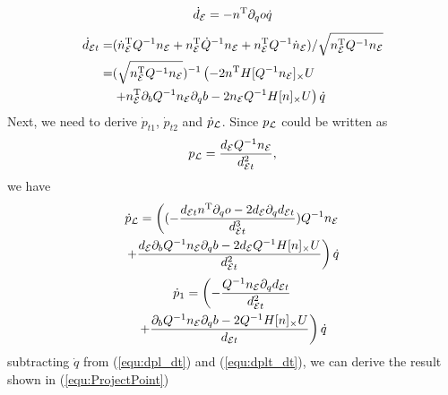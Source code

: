 \documentclass[journal]{IEEEtran}  %
\begin{document}
    \begin{equation}
      \dot d_{\mathcal{E}} = -n^\mathrm{T} \partial_q o \dot q
    \end{equation}
    \begin{equation}\label{equ:dot det}
      \begin{split}
        \dot d_{\mathcal{E} t} =&  (\dot n_{\mathcal{E}}^\mathrm{T} Q^{-1} n_{\mathcal{E}} + n_{\mathcal{E}}^\mathrm{T} \dot Q^{-1} n_{\mathcal{E}} + n_{\mathcal{E}}^\mathrm{T} Q^{-1} \dot n_{\mathcal{E}}) /\sqrt{n_{\mathcal{E}}^\mathrm{T} Q^{-1} n_{\mathcal{E}}}\\
        = & (\sqrt{n_{\mathcal{E}}^\mathrm{T} Q^{-1} n_{\mathcal{E}}})^{-1}\left(-2n^\mathrm{T} H[Q^{-1}n_{\mathcal{E}}]_\times U \right.\\
        &\left. + n_{\mathcal{E}} ^\mathrm{T} \partial_b Q^{-1} n_{\mathcal{E}} \partial_q b  -2 n_{\mathcal{E}} Q^{-1}H[n]_\times U \right) \dot q
      \end{split}
    \end{equation}
    Next, we need to derive  $\dot p_{t1}$, $\dot p_{t2} $ and $\dot p_{\mathcal{L}}$. Since $p_{\mathcal{L}}$ could be written as
    \begin{equation}
      p_{\mathcal{L}} = \frac{d_{\mathcal{E}} Q^{-1} n_{\mathcal{E}}}{ d_{\mathcal{E} t} ^2},
    \end{equation}
    we have
    \begin{multline}\label{equ:dpl_dt}
        \dot p_{\mathcal{L}} =  \left( (-\frac{d_{\mathcal{E} t} n^\mathrm{T} \partial_q o -2d_{\mathcal{E}} \partial_q d_{\mathcal{E} t}}{d_{\mathcal{E} t}^3} )Q^{-1}n_{\mathcal{E}} \right.\\
        \left .+ \frac{d_{\mathcal{E}}\partial_b Q^{-1} n_{\mathcal{E}} \partial_q b -  2d_{\mathcal{E}} Q^{-1}H[n]_\times U}{d_{\mathcal{E} t}^2}\right) \dot q
    \end{multline}
    \begin{multline}\label{equ:dplt_dt}
        \dot p_{1} =  \left(-\frac{Q^{-1}n_{\mathcal{E}} \partial_q d_{\mathcal{E} t} }{d_{\mathcal{E} t}^2} \right.\\
         \left. + \frac{\partial_b Q^{-1}n_{\mathcal{E}} \partial_q b -  2Q^{-1}H[n]_\times U }{d_{\mathcal{E} t}} \right) \dot q
    \end{multline}
    subtracting $\dot q$ from (\ref{equ:dpl_dt}) and (\ref{equ:dplt_dt}), we can derive the result shown in (\ref{equ:ProjectPoint})


{\small


}
\end{document}
